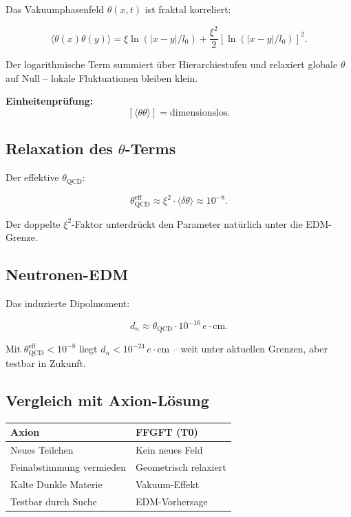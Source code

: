 	Das Vakuumphasenfeld \(\theta(x,t)\) ist fraktal korreliert:
	
	\begin{equation}
		\langle \theta(x) \theta(y) \rangle = \xi \ln(|x-y|/l_0) + \frac{\xi^2}{2} [\ln(|x-y|/l_0)]^2.
	\end{equation}
	
	Der logarithmische Term summiert über Hierarchiestufen und relaxiert globale \(\theta\) auf Null – lokale Fluktuationen bleiben klein.
	
	\textbf{Einheitenprüfung:}
	\[
	[\langle \theta \theta \rangle] = \text{dimensionslos}.
	\]
	
	\subsection*{Relaxation des \(\theta\)-Terms}
	
	Der effektive \(\theta_{\text{QCD}}\):
	
	\begin{equation}
		\theta_{\text{QCD}}^{\text{eff}} \approx \xi^2 \cdot \langle \delta \theta \rangle \approx 10^{-8}.
	\end{equation}
	
	Der doppelte \(\xi^2\)-Faktor unterdrückt den Parameter natürlich unter die EDM-Grenze.
	
	\subsection*{Neutronen-EDM}
	
	Das induzierte Dipolmoment:
	
	\begin{equation}
		d_n \approx \theta_{\text{QCD}} \cdot 10^{-16} \, e \cdot \text{cm}.
	\end{equation}
	
	Mit \(\theta_{\text{QCD}}^{\text{eff}} < 10^{-8}\) liegt \(d_n < 10^{-24} \, e \cdot \text{cm}\) – weit unter aktuellen Grenzen, aber testbar in Zukunft.
	
	\subsection*{Vergleich mit Axion-Lösung}
	
	\begin{center}
		\begin{tabular}{p{}p{}}
			\textbf{Axion} & \textbf{FFGFT (T0)} \\
			\hline
			Neues Teilchen & Kein neues Feld \\
			Feinabstimmung vermieden & Geometrisch relaxiert \\
			Kalte Dunkle Materie & Vakuum-Effekt \\
			Testbar durch Suche & EDM-Vorhersage \\
		\end{tabular}
	\end{center}
	
